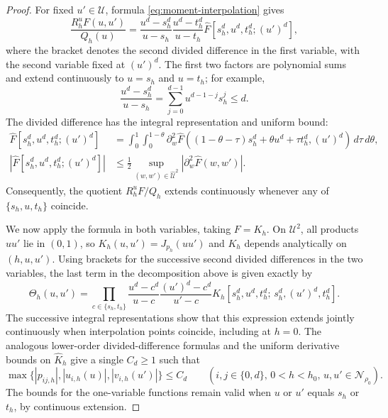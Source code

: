 \begin{proof}
For fixed $u'\in\mathcal U$, formula \eqref{eq:moment-interpolation} gives
\begin{equation*}
  \frac{R_h^uF(u,u')}{Q_h(u)}
  =\frac{u^d-s_h^d}{u-s_h}\frac{u^d-t_h^d}{u-t_h}
    \widehat F[s_h^d,u^d,t_h^d;(u')^d],
\end{equation*}
where the bracket denotes the second divided difference in the first
variable, with the second variable fixed at $(u')^d$.
The first two factors are polynomial sums and extend continuously to $u=s_h$
and $u=t_h$; for example,
\[
  \frac{u^d-s_h^d}{u-s_h}
  =\sum_{j=0}^{d-1}u^{d-1-j}s_h^j
  \le d.
\]
The divided difference has the integral representation and uniform bound:
\[
\begin{aligned}
  \widehat F[s_h^d,u^d,t_h^d;(u')^d]
  &=\int_0^1\int_0^{1-\theta}
    \partial_w^2\widehat F
    \!\left((1-\theta-\tau)s_h^d+\theta u^d+\tau t_h^d,(u')^d\right)\,d\tau\,d\theta,\\
  \left|\widehat F[s_h^d,u^d,t_h^d;(u')^d]\right|
  &\le \frac12\sup_{(w,w')\in\widehat{\mathcal U}^2}
    |\partial_w^2\widehat F(w,w')|.
\end{aligned}
\]
Consequently, the quotient $R_h^uF/Q_h$ extends continuously whenever any of
$\{s_h,u,t_h\}$ coincide.

We now apply the formula in both variables, taking $F=K_h$.  On
$\mathcal U^2$, all products $uu'$ lie in $(0,1)$, so $K_h(u,u')=J_{p_h}(uu')$
and $K_h$ depends analytically on $(h,u,u')$.  Using brackets for the
successive second divided differences in the two variables, the last term in
the decomposition above is given exactly by
\[
  \Theta_h(u,u')
  =\prod_{c\in\{s_h,t_h\}}
    \frac{u^d-c^d}{u-c}\frac{(u')^d-c^d}{u'-c}
    \widehat K_h[s_h^d,u^d,t_h^d;\,s_h^d,(u')^d,t_h^d].
\]
The successive integral representations show that this expression extends
jointly continuously when interpolation points coincide, including at
$h=0$.  The analogous lower-order divided-difference formulas and the uniform
derivative bounds on $\widehat K_h$ give a single $C_d\ge1$ such that
\[
  \max\bigl\{|p_{ij,h}|,|u_{i,h}(u)|,|v_{i,h}(u')|\bigr\}\le C_d
  \qquad  (i,j\in\{0,d\},\,0<h<h_0,\,u,u'\in\mathcal N_{\rho_0}).
\]
The bounds for the one-variable functions remain valid when $u$ or $u'$ equals
$s_h$ or $t_h$, by continuous extension.


\end{proof}

